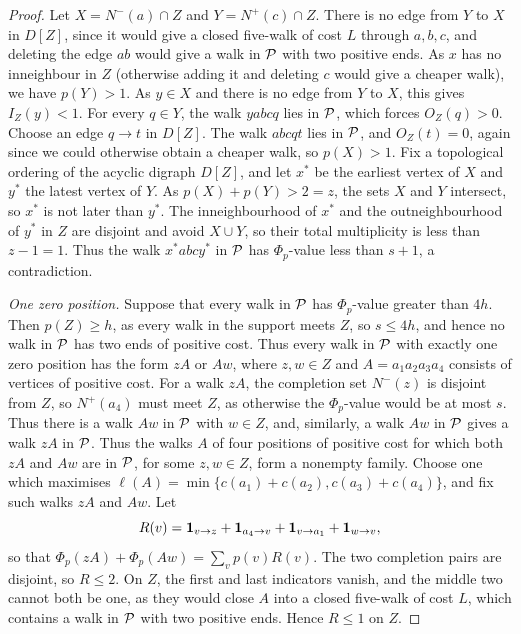 \begin{proof}
Let $X=N^-(a)\cap Z$ and $Y=N^+(c)\cap Z$. There is no edge
from $Y$ to $X$ in $D[Z]$, since it would give a closed five-walk of cost $L$ through $a,b,c$, and deleting the edge $ab$ would give a walk in $\mathcal P$ with two positive ends.
As $x$ has no inneighbour in $Z$ (otherwise adding it and deleting $c$ would give a cheaper walk), we have $p(Y)>1$.
As $y\in X$ and there is no edge from $Y$ to $X$, this gives $I_Z(y)<1$. For every $q\in Y$, the walk $yabcq$ lies in $\mathcal P$, which forces $O_Z(q)>0$. Choose an edge $q\to t$ in $D[Z]$. The walk $abcqt$ lies in $\mathcal P$, and $O_Z(t)=0$, again since we could otherwise obtain a cheaper walk, so $p(X)>1$.
Fix a topological ordering of the acyclic digraph $D[Z]$, and let $x^*$ be the earliest vertex of $X$ and $y^*$ the latest vertex of $Y$. As $p(X)+p(Y)>2=z$, the sets $X$ and $Y$ intersect, so $x^*$ is not later than $y^*$. The inneighbourhood of $x^*$ and the outneighbourhood of $y^*$ in $Z$ are disjoint and avoid $X\cup Y$, so their total multiplicity is less than $z-1=1$.
Thus the walk $x^*abcy^*$ in $\mathcal P$ has $\Phi_p$-value less than $s+1$, a contradiction.

\emph{One zero position.}
Suppose that every walk in $\mathcal P$ has $\Phi_p$-value greater than $4h$. Then $p(Z)\ge h$, as every walk in the support meets $Z$, so $s\le4h$, and hence no walk in $\mathcal P$ has two ends of positive cost.
Thus every walk in $\mathcal P$ with exactly one zero position has the form $zA$ or $Aw$, where $z,w\in Z$ and $A=a_1a_2a_3a_4$ consists of vertices of positive cost. For a walk $zA$, the completion set $N^-(z)$ is disjoint from $Z$, so $N^+(a_4)$ must meet $Z$, as otherwise the $\Phi_p$-value would be at most $s$. Thus there is a walk $Aw$ in $\mathcal P$ with $w\in Z$, and, similarly, a walk $Aw$ in $\mathcal P$ gives a walk $zA$ in $\mathcal P$.
Thus the walks $A$ of four positions of positive cost for which both $zA$ and $Aw$ are in $\mathcal P$, for some $z,w\in Z$, form a nonempty family. Choose one which maximises
$\ell(A)=\min\{c(a_1)+c(a_2),c(a_3)+c(a_4)\}$, and fix such walks $zA$ and $Aw$. Let
\[
 R(v)=\mathbf 1_{v\to z}+\mathbf 1_{a_4\to v}
                     +\mathbf 1_{v\to a_1}+\mathbf 1_{w\to v},
\]
so that $\Phi_p(zA)+\Phi_p(Aw)=\sum_vp(v)R(v)$.
The two completion pairs are disjoint, so $R\le2$.
On $Z$, the first and last indicators vanish, and the middle two cannot both be one, as they would close $A$ into a closed five-walk of cost $L$, which contains a walk in $\mathcal P$ with two positive ends. Hence $R\le1$ on $Z$.


\end{proof}
